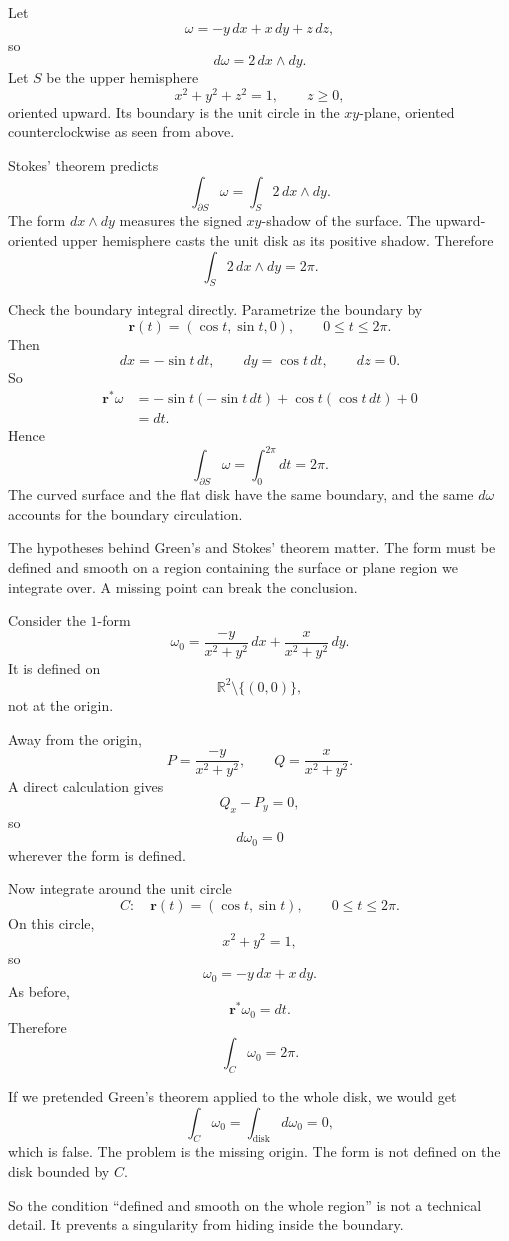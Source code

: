 \begin{example}
Let
\[
    \omega=-y\,dx+x\,dy+z\,dz,
\]
so
\[
    d\omega=2\,dx\wedge dy.
\]
Let \(S\) be the upper hemisphere
\[
    x^2+y^2+z^2=1,\qquad z\ge0,
\]
oriented upward.  Its boundary is the unit circle in the \(xy\)-plane, oriented
counterclockwise as seen from above.

Stokes' theorem predicts
\[
    \int_{\partial S}\omega=\int_S 2\,dx\wedge dy.
\]
The form \(dx\wedge dy\) measures the signed \(xy\)-shadow of the surface.  The
upward-oriented upper hemisphere casts the unit disk as its positive shadow.  Therefore
\[
    \int_S 2\,dx\wedge dy=2\pi.
\]

Check the boundary integral directly.  Parametrize the boundary by
\[
    \mathbf r(t)=(\cos t,\sin t,0),
    \qquad
    0\le t\le2\pi.
\]
Then
\[
    dx=-\sin t\,dt,
    \qquad
    dy=\cos t\,dt,
    \qquad
    dz=0.
\]
So
\[
\begin{aligned}
    \mathbf r^*\omega
    &=
    -\sin t(-\sin t\,dt)+\cos t(\cos t\,dt)+0\\
    &=
    dt.
\end{aligned}
\]
Hence
\[
\boxed{
    \int_{\partial S}\omega=\int_0^{2\pi}dt=2\pi.
}
\]
The curved surface and the flat disk have the same boundary, and the same \(d\omega\)
accounts for the boundary circulation.
\end{example}

The hypotheses behind Green's and Stokes' theorem matter.  The form must be defined
and smooth on a region containing the surface or plane region we integrate over.  A
missing point can break the conclusion.

\begin{example}
Consider the \(1\)-form
\[
    \omega_0
    =
    \frac{-y}{x^2+y^2}\,dx
    +
    \frac{x}{x^2+y^2}\,dy.
\]
It is defined on
\[
    \mathbb R^2\setminus\{(0,0)\},
\]
not at the origin.

Away from the origin,
\[
    P=\frac{-y}{x^2+y^2},
    \qquad
    Q=\frac{x}{x^2+y^2}.
\]
A direct calculation gives
\[
    Q_x-P_y=0,
\]
so
\[
    d\omega_0=0
\]
wherever the form is defined.

Now integrate around the unit circle
\[
    C:\quad \mathbf r(t)=(\cos t,\sin t),
    \qquad 0\le t\le2\pi.
\]
On this circle,
\[
    x^2+y^2=1,
\]
so
\[
    \omega_0=-y\,dx+x\,dy.
\]
As before,
\[
    \mathbf r^*\omega_0=dt.
\]
Therefore
\[
\boxed{
    \int_C\omega_0=2\pi.
}
\]

If we pretended Green's theorem applied to the whole disk, we would get
\[
    \int_C\omega_0
    =
    \int_{\text{disk}}d\omega_0
    =
    0,
\]
which is false.  The problem is the missing origin.  The form is not defined on the
disk bounded by \(C\).

So the condition ``defined and smooth on the whole region'' is not a technical detail.
It prevents a singularity from hiding inside the boundary.
\end{example}

